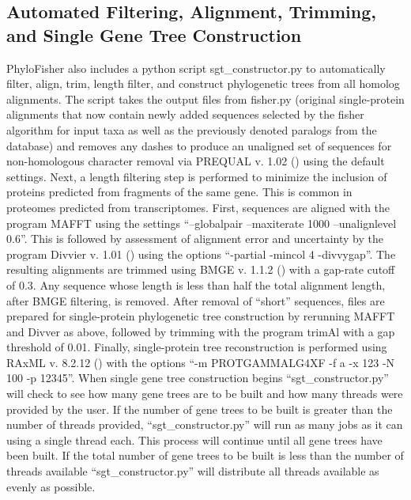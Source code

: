 \documentclass{article}
\begin{document}
        \subsection{Automated Filtering, Alignment, Trimming, and Single Gene Tree Construction}
        \label{sec:sgtmethods}
            PhyloFisher also includes a python script sgt\_constructor.py to automatically filter, align, trim, length filter, and construct phylogenetic trees from all homolog alignments. The script takes the output files from fisher.py (original single-protein alignments that now contain newly added sequences selected by the fisher algorithm for input taxa as well as the previously denoted paralogs from the database) and removes any dashes to produce an unaligned set of sequences for non-homologous character removal via PREQUAL v. 1.02 (\cite{whelan_prequal_2018}) using the default settings. Next, a length filtering step is performed to minimize the inclusion of proteins predicted from fragments of the same gene. This is common in proteomes predicted from transcriptomes. First, sequences are aligned with the program MAFFT using the settings “--globalpair --maxiterate 1000 --unalignlevel 0.6”. This is followed by assessment of alignment error and uncertainty by the program Divvier v. 1.01 (\cite{ali_identifying_2019}) using the options “-partial -mincol 4 -divvygap”. The resulting alignments are trimmed using BMGE v. 1.1.2 (\cite{criscuolo_bmge_2010}) with a gap-rate cutoff of 0.3. Any sequence whose length is less than half the total alignment length, after BMGE filtering, is removed. After removal of “short” sequences, files are prepared for single-protein phylogenetic tree construction by rerunning MAFFT and Divver as above, followed by trimming with the program trimAl with a gap threshold of 0.01. Finally, single-protein tree reconstruction is performed using RAxML v. 8.2.12 (\cite{stamatakis_raxml_2014}) with the options “-m PROTGAMMALG4XF -f a -x 123 -N 100 -p 12345”. When single gene tree construction begins “sgt\_constructor.py” will check to see how many gene trees are to be built and how many threads were provided by the user. If the number of gene trees to be built is greater than the number of threads provided, “sgt\_constructor.py” will run as many jobs as it can using a single thread each. This process will continue until all gene trees have been built. If the total number of gene trees to be built is less than the number of threads available “sgt\_constructor.py” will distribute all threads available as evenly as possible.
            
\end{document}

